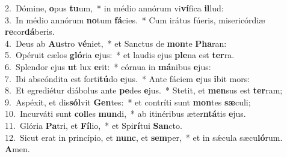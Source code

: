 {2.~}Dómine, \textbf{o}pus \textbf{tu}um,~* in médio annórum vi\textbf{ví}fica \textbf{il}lud:\\
{3.~}In médio annórum \textbf{no}tum \textbf{fá}cies.~* Cum irátus fúeris, misericórdiæ \textbf{re}cor\textbf{dá}beris.\\
{4.~}Deus ab \textbf{Au}stro \textbf{vé}niet,~* et Sanctus de \textbf{mon}te \textbf{Pha}ran:\\
{5.~}Opéruit cælos \textbf{gló}ria \textbf{e}jus:~* et laudis ejus \textbf{ple}na est \textbf{ter}ra.\\
{6.~}Splendor ejus \textbf{ut} lux \textbf{e}rit:~* córnua in \textbf{má}nibus \textbf{e}jus:\\
{7.~}Ibi abscóndita est forti\textbf{tú}do \textbf{e}jus.~* Ante fáciem \textbf{e}jus \textbf{i}bit mors:\\
{8.~}Et egrediétur diábolus ante \textbf{pe}des \textbf{e}jus.~* Stetit, et \textbf{men}sus est \textbf{ter}ram;\\
{9.~}Aspéxit, et dis\textbf{sól}vit \textbf{Gen}tes:~* et contríti sunt \textbf{mon}tes \textbf{sæ}culi;\\
{10.~}Incurváti sunt \textbf{col}les \textbf{mun}di,~* ab itinéribus æter\textbf{ntá}tis \textbf{e}jus.\\
{11.~}Glória \textbf{Pa}tri, et \textbf{Fí}lio,~* et Spi\textbf{rí}tui \textbf{San}cto.\\
{12.~}Sicut erat in princípio, et \textbf{nunc}, et \textbf{sem}per,~* et in sǽcula sæcu\textbf{ló}rum. \textbf{A}men.\\
